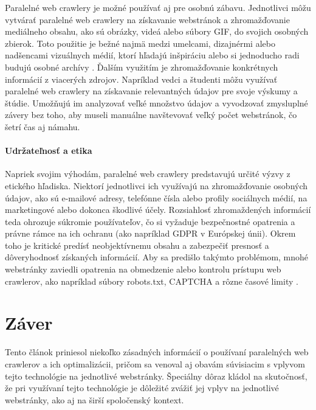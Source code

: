 \documentclass[10pt,twoside,slovak,a4paper]{article}
\begin{document}
Paralelné web crawlery je možné používať aj pre osobnú zábavu. Jednotlivci môžu vytvárať paralelné web crawlery na získavanie webstránok a zhromažďovanie mediálneho obsahu, ako sú obrázky, videá alebo súbory GIF, do svojich osobných zbierok. Toto použitie je bežné najmä medzi umelcami, dizajnérmi alebo nadšencami vizuálnych médií, ktorí hľadajú inšpiráciu alebo si jednoducho radi budujú osobné archívy \cite{pennock2013web}. Ďalším využitím je zhromažďovanie konkrétnych informácií z viacerých zdrojov. Napríklad vedci a študenti môžu využívať paralelné web crawlery na získavanie relevantných údajov pre svoje výskumy a štúdie. Umožňujú im analyzovať veľké množstvo údajov a vyvodzovať zmysluplné závery bez toho, aby museli manuálne navštevovať veľký počet webstránok, čo šetrí čas aj námahu.

\paragraph{Udržateľnosť a etika}

Napriek svojim výhodám, paralelné web crawlery predstavujú určité výzvy z etického hľadiska. Niektorí jednotlivci ich využívajú na zhromažďovanie osobných údajov, ako sú e-mailové adresy, telefónne čísla alebo profily sociálnych médií, na marketingové alebo dokonca škodlivé účely. Rozsiahlosť zhromaždených informácií teda ohrozuje súkromie používateľov, čo si vyžaduje bezpečnostné opatrenia a právne rámce na ich ochranu (ako napríklad GDPR v Európskej únii). Okrem toho je kritické predísť neobjektívnemu obsahu a zabezpečiť presnosť a dôveryhodnosť získaných informácií. Aby sa predišlo takýmto problémom, mnohé webstránky zaviedli opatrenia na obmedzenie alebo kontrolu prístupu web crawlerov, ako napríklad súbory robots.txt, CAPTCHA a rôzne časové limity \cite{thelwall2006web}.

\section{Záver}

Tento článok priniesol niekoľko zásadných informácií o používaní paralelných web crawlerov a ich optimalizácii, pričom sa venoval aj obavám súvisiacim s vplyvom tejto technológie na jednotlivé webstránky. Špeciálny dôraz kládol na skutočnosť, že pri využívaní tejto technológie je dôležité zvážiť jej vplyv na jednotlivé webstránky, ako aj na širší spoločenský kontext.

\newpage



\end{document}

